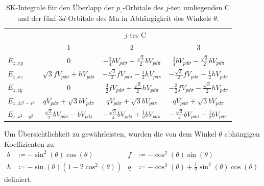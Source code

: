 \begin{table}
    \centering
    \caption{SK-Integrale für den Überlapp der $p_z$-Orbitale des $j$-ten umliegenden
    C und der fünf $3d$-Orbitale des Mn in Abhängigkeit des Winkels $\theta$.}
    \label{tab:slaterkosters}
    \begin{tabular}{l c c c}
    & \multicolumn{3}{c}{$j$-tes C}\\
    \cmidrule(lr){2-4}
    & {$1$} & {$2$} & {$3$} \\
    \midrule
    {$E_{z,xy}$      }  & {$0$}                                               & {$-\frac{3}{4}bV_{pd\sigma} + \frac{\sqrt{3}}{2}bV_{pd\pi}$}          & {$ \frac{3}{4}bV_{pd\sigma}-\frac{\sqrt{3}}{2}bV_{pd\pi}$}         \vspace{0.5cm} \\ 
    {$E_{z,xz}$      }  & {$\sqrt{3}fV_{pd\sigma} + hV_{pd\pi}$}              & {$-\frac{\sqrt{3}}{2}fV_{pd\sigma} - \frac{1}{2} hV_{pd\pi}$}         & {$-\frac{\sqrt{3}}{2}fV_{pd\sigma} - \frac{1}{2} hV_{pd\pi}$}      \vspace{0.5cm} \\
    {$E_{z,zy}$      }  & {$0$}                                               & {$ \frac{3}{2}fV_{pd\sigma}+\frac{\sqrt{3}}{2} hV_{pd\pi}$}           & {$-\frac{3}{2}fV_{pd\sigma}-\frac{\sqrt{3}}{2} hV_{pd\pi}$}        \vspace{0.5cm} \\
    {$E_{z,3z^2-r^2}$}  & {$q V_{pd\sigma}+\sqrt{3}bV_{pd\pi}$}               & {$q V_{pd\sigma}+\sqrt{3}bV_{pd\pi}$}                                 & {$q V_{pd\sigma}+\sqrt{3}bV_{pd\pi}$} \vspace{0.5cm} \\
    {$E_{z,x^2-y^2}$ }  & {$\frac{\sqrt{3}}{2}bV_{pd\sigma}-bV_{pd\pi}$}      & {$-\frac{\sqrt{3}}{4}bV_{pd\sigma}+\frac{1}{2}bV_{pd\pi}$}           & {$-\frac{\sqrt{3}}{4}bV_{pd\sigma}+\frac{1}{2}bV_{pd\pi}$}                       \\ 
    \bottomrule
    \end{tabular}
  \end{table}
Um Übersichtlichkeit zu gewährleisten, wurden die von dem Winkel $\theta$ abhängigen Koeffizienten zu
\begin{equation}
    \begin{aligned}
b & \coloneq -\sin^2(\theta) \cos(\theta)        & f &  \coloneq -\cos^2(\theta) \sin(\theta)                             \\                     
h & \coloneq -\sin(\theta)(1-2\cos^2(\theta))    & q &  \coloneq -\cos^3(\theta) + \frac{1}{2}\sin^2(\theta) \cos(\theta)
    \end{aligned} \label{eqn:Vorfaktoren}
\end{equation}
definiert.
